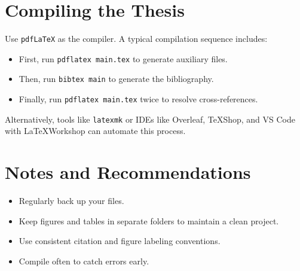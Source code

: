 \section{Compiling the Thesis}
\begin{paragraph}
Use \texttt{pdfLaTeX} as the compiler. A typical compilation sequence includes:
\begin{itemize}[leftmargin=\paritemindent]
    \item First, run \texttt{pdflatex main.tex} to generate auxiliary files.
    \item Then, run \texttt{bibtex main} to generate the bibliography.
    \item Finally, run \texttt{pdflatex main.tex} twice to resolve cross-references.
\end{itemize}

Alternatively, tools like \texttt{latexmk} or IDEs like Overleaf, TeXShop, and VS Code with \LaTeX Workshop can automate this process.
\end{paragraph}

\section{Notes and Recommendations}
\begin{paragraph}
\begin{itemize}[leftmargin=\paritemindent]
    \item Regularly back up your files.
    \item Keep figures and tables in separate folders to maintain a clean project.
    \item Use consistent citation and figure labeling conventions.
    \item Compile often to catch errors early.
\end{itemize}
\end{paragraph}
